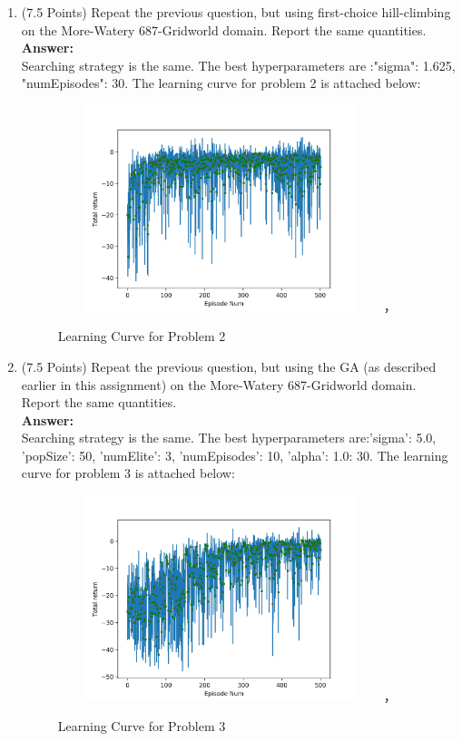 \documentclass[]{article}
\begin{document}
\begin{enumerate}
    \item (7.5 Points) Repeat the previous question, but using first-choice hill-climbing on the More-Watery 687-Gridworld domain. Report the same quantities.  \\
    \textbf{Answer:}\\
    Searching strategy is the same. The best hyperparameters are :"sigma": 1.625, "numEpisodes": 30. The learning curve for problem 2 is attached below:
    \begin{figure}[htbp]
        \centering
        \includegraphics[height=6.0cm,width=9.5cm]{p2.png}，
        \caption{Learning Curve for Problem 2}
    \end{figure}
    
    \item (7.5 Points) Repeat the previous question, but using the GA (as described earlier in this assignment) on the More-Watery 687-Gridworld domain. Report the same quantities. \\
    \textbf{Answer:}\\
    Searching strategy is the same. The best hyperparameters are:'sigma': 5.0, 'popSize': 50, 'numElite': 3, 'numEpisodes': 10, 'alpha': 1.0: 30. The learning curve for problem 3 is attached below:
    \begin{figure}[htbp]
        \centering
        \includegraphics[height=6.0cm,width=9.5cm]{p3.png}，
        \caption{Learning Curve for Problem 3}
    \end{figure}
    

\end{enumerate}
\end{document}
